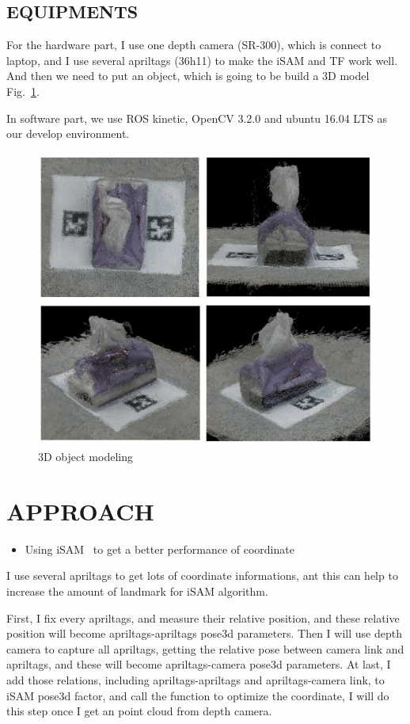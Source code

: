 \documentclass[letterpaper, 10 pt, conference]{ieeeconf}  %
\begin{document}
\subsection{EQUIPMENTS} 

For the hardware part, I use one depth camera (SR-300), which is connect to laptop, and I use several apriltags (36h11) to make the iSAM and TF work well. And then we need to put an object, which is going to be build a 3D model Fig.~\ref{figure:tissue}.

In software part, we use ROS kinetic, OpenCV 3.2.0 and ubuntu 16.04 LTS as our develop environment.

\begin{figure}[t] %
\includegraphics[width=0.8\columnwidth]{tissue}
\centering
\caption{3D object modeling}
\label{figure:tissue}
\end{figure}

\section{APPROACH}

\begin{itemize}
\item Using iSAM~\cite{kaess2008isam} to get a better performance of coordinate
\end{itemize}

I use several apriltags to get lots of coordinate informations, ant this can help to increase the amount of landmark for iSAM algorithm.

First, I fix every apriltags, and measure their relative position, and these relative position will become apriltags-apriltags pose3d parameters. Then I will use depth camera to capture all apriltags, getting the relative pose between camera link and apriltags, and these will become apriltags-camera pose3d parameters. At last, I add those relations, including apriltags-apriltags and apriltags-camera link, to iSAM pose3d factor, and call the function to optimize the coordinate, I will do this step once I get an point cloud from depth camera.
\end{document}
